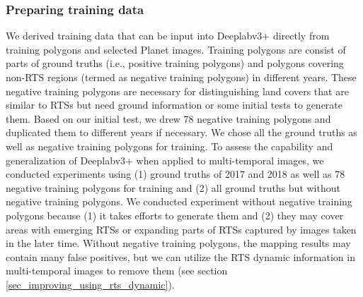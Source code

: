 \documentclass[authoryear,preprint,review,12pt]{elsarticle}
\begin{document}

\subsubsection{Preparing training data}
\label{sec_prepare_training}



We derived training data that can be input into Deeplabv3+ directly from training polygons and selected Planet images.
Training polygons are consist of parts of ground truths (i.e., positive training polygons) and polygons covering non-RTS regions (termed as negative training polygons) in different years.
These negative training polygons are necessary for distinguishing land covers that are similar to RTSs but need ground information or some initial tests to generate them. 
Based on our initial test, we drew 78 negative training polygons and duplicated them to different years if necessary. 
We chose all the ground truths as well as negative training polygons for training. 
To assess the capability and generalization of Deeplabv3+ when applied to multi-temporal images, we conducted experiments using (1) ground truths of 2017 and 2018 as well as 78 negative training polygons for training and (2) all ground truths but without negative training polygons.
We conducted experiment without negative training polygons because (1) it takes efforts to generate them and (2) they may cover areas with emerging RTSs or expanding parts of RTSs captured by images taken in the later time. 
Without negative training polygons, the mapping results may contain many false positives, but we can utilize the RTS dynamic information in multi-temporal images to remove them (see section \ref{sec_improving_using_rts_dynamic}).
\end{document}
